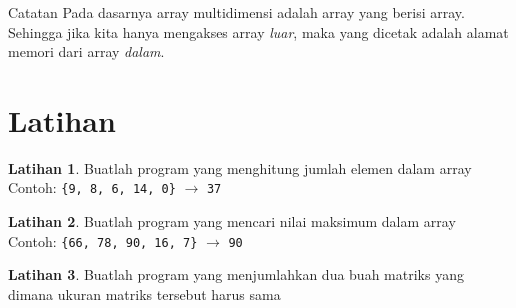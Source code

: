 \documentclass[aspectratio=169]{beamer}
\theoremstyle{definition}
\newtheorem{latihan}{Latihan}
\begin{document}
    \begin{frame}
        \frametitle{\insertsection}
        \begin{alertblock}{Catatan}
            Pada dasarnya array multidimensi adalah array yang berisi array. Sehingga jika kita hanya mengakses array \textit{luar}, maka yang dicetak adalah alamat memori dari array \textit{dalam}.
        \end{alertblock}
    \end{frame}

    \section{Latihan}
    \begin{frame}
        \begin{latihan}
            Buatlah program yang menghitung jumlah elemen dalam array\\
            Contoh: \texttt{\{9, 8, 6, 14, 0\}} $\to$ \texttt{37}
        \end{latihan}
        \begin{latihan}
            Buatlah program yang mencari nilai maksimum dalam array\\
            Contoh: \texttt{\{66, 78, 90, 16, 7\}} $\to$ \texttt{90}
        \end{latihan}
        \begin{latihan}
            Buatlah program yang menjumlahkan dua buah matriks yang dimana ukuran matriks tersebut harus sama
        \end{latihan}
    \end{frame}
\end{document}
